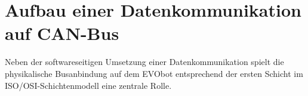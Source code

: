 \begin{comment}
	TODO:
	--> Bildquellen überprüfen
	--> Referenzen zu Bilder, Tabellen und Quellen im Text prüfen
	--> Einarbeitungleitfaden ergänzen: neuer Knoten anlegen, Directory builden usw aus Fabis Anleitung
	--> Einarbeitungleitfaden ergänzen: Midnight Commander 
	
	--> Kapitel zur Fernsteuerung des EVObots: zuerst via VNC Client Desktop gespiegelt, um mobil ohne Bildschirm und Maus/Tastatur auf Gerät arbeiten zu können. Später hat sich aber gezeigt, dass Grafikberechnung und Übertragung des Desktops zu viel Rechenleistung benötigt, wodurch Rechenleistung von ROS reduziert wird, demnach kamen Algorithmen zum Spurhalten dem realen Verhalten nicht hinterher, deshalb Zeitverzug und keine Spurregelung möglich! Umstieg auf SSH zugriff via Terminal auf PC, grafische Benutzeroberfläche auf Ubuntu deaktiviert, um sämtliche Ressourcen für ROS zu generieren. Ergebnis zeigt echtzeitgetreue Spurerfassung und Regelung!

	CAN-to-WiFi Gateway mit PaspberryPi oder Ardiuno möglich
	
	Mehr Zustandsüberwachungssystem als Diagnosesystem 
	
	Off-Board-Kommunikation als Diagnose in ISO Schicht 7 geregelt 
	
	Generierung von Diagnosedaten ist von Beginn der Entwicklung an essentiell, um spätere Komplexität zu beherrschen. 
	
	Fehler sind üblich in komplexen Systemen. Sollten vermieden werden, kommen aber unter bestimmten Bedingungen und Voraussetzungen vor. Abhängig von Implementierung, Fehlervermeidung usw. Fale-Safe-Zustand. Fehlerzustand, Fehlerwirkung
	Wie äußert sich Fehler oder Fehlfunktion? --> unplausibler Signalwert, falscher Wert oder out of range
	
	Abweichung zum SOLL ist nicht unbedingt programmseitiger Fehler, sondern kann aus Logikfunktion des Programmierers folgen. 
\end{comment}



\section{Aufbau einer Datenkommunikation auf CAN-Bus} \label{sec:AufbauDatenkommunikation} %
Neben der softwareseitigen Umsetzung einer Datenkommunikation spielt die physikalische Busanbindung auf dem EVObot entsprechend der ersten Schicht im ISO/OSI-Schichtenmodell eine zentrale Rolle. 

